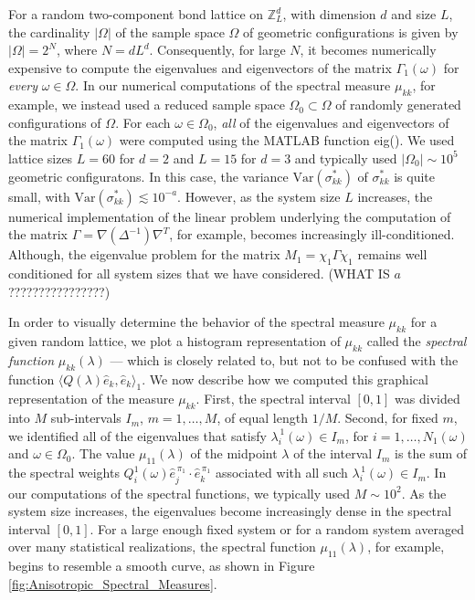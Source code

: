 \documentclass{cmslatex}
\begin{document}
For a random two-component bond lattice on $\mathbb{Z}^d_L$, with
dimension $d$ and size $L$, the cardinality $|\Omega|$ of the sample space
$\Omega$ of geometric configurations is 
given by $|\Omega|=2^N$, where $N=dL^d$. Consequently, for large $N$, it
becomes numerically expensive to compute the eigenvalues and
eigenvectors of the matrix $\Gamma_1(\omega)$ for \emph{every} $\omega\in\Omega$. In our
numerical computations of the spectral measure $\mu_{kk}$, for example,
we instead used a reduced sample space $\Omega_0\subset\Omega$ of randomly generated
configurations of $\Omega$. For each $\omega\in\Omega_0$, \emph{all} of the eigenvalues
and eigenvectors of the matrix $\Gamma_1(\omega)$ were computed using the MATLAB
function eig(). We used lattice sizes $L=60$ for $d=2$ and $L=15$ for 
$d=3$ and typically used $|\Omega_0|\sim10^5$ geometric configuratons. In this
case, the variance $\text{Var}(\sigma^*_{kk})$ of $\sigma^*_{kk}$ is quite small, with
$\text{Var}(\sigma^*_{kk})\lesssim10^{-a}$. However, as the system size $L$  
increases, the numerical implementation of the linear problem
underlying the computation of the matrix $\Gamma=\nabla(\Delta^{-1})\nabla^T$, for
example, becomes increasingly ill-conditioned. Although, the
eigenvalue problem for the matrix $M_1=\chi_1\Gamma\chi_1$ remains well
conditioned for all system sizes that we have considered.
(WHAT IS $a$????????????????)


In order to visually determine the behavior of the spectral measure
$\mu_{kk}$ for a given random lattice, we plot a histogram representation
of $\mu_{kk}$ called the \emph{spectral function} $\mu_{kk}(\lambda)$ --- which is
closely related to, but not to be confused with the function
$\langle Q(\lambda)\hat{e}_k,\hat{e}_k\rangle_1$. We now describe how we computed 
this graphical representation of the measure $\mu_{kk}$. First, the
spectral interval $[0,1]$ was divided into $M$ sub-intervals $I_m$,
$m=1,\ldots,M$, of equal length $1/M$. Second, for fixed $m$, we identified
all of the eigenvalues that satisfy $\lambda^{\,1}_i(\omega)\in I_m$, for
$i=1,\ldots,N_1(\omega)$ and $\omega\in\Omega_0$. The value $\mu_{11}(\lambda)$ of the midpoint $\lambda$
of the interval $I_m$ is the sum of the spectral weights
$Q^1_i(\omega)\hat{e}_j^{\,\pi_1}\cdot\hat{e}_k^{\,\pi_1}$ associated with all such
$\lambda^{\,1}_i(\omega)\in I_m$. In our computations of the spectral functions, we
typically used $M\sim10^2$. As the system size increases, the eigenvalues
become increasingly dense in the spectral interval $[0,1]$. For a
large enough fixed system or for a random system averaged over many
statistical realizations, the spectral function $\mu_{11}(\lambda)$, for
example, begins to resemble a smooth curve, as shown in Figure
\ref{fig:Anisotropic_Spectral_Measures}.     
\end{document}
